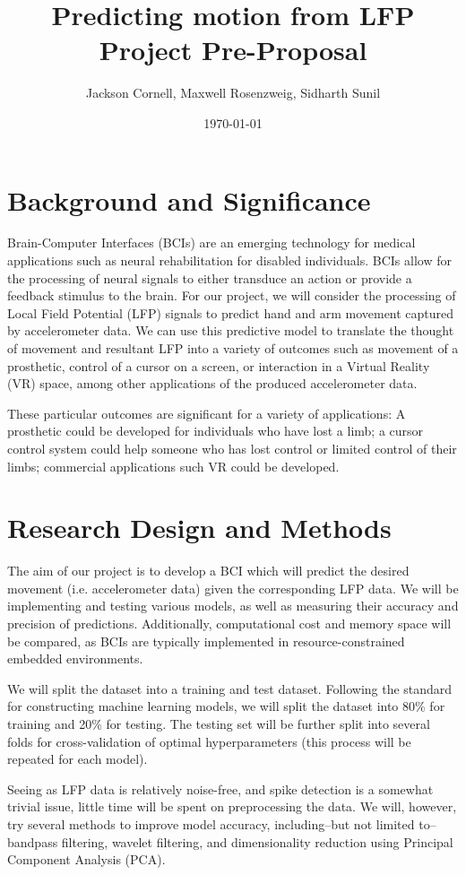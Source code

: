 \documentclass[12pt]{article}
\title{ Predicting motion from LFP Project Pre-Proposal }
\author{ Jackson Cornell, Maxwell Rosenzweig, Sidharth Sunil }
\date{\today}
\begin{document}
\maketitle

\section{Background and Significance}

Brain-Computer Interfaces (BCIs) are an emerging technology for medical applications such as neural rehabilitation for disabled individuals. BCIs allow for the processing of neural signals to either transduce an action or provide a feedback stimulus to the brain. For our project, we will consider the processing of Local Field Potential (LFP) signals to predict hand and arm movement captured by accelerometer data. We can use this predictive model to translate the thought of movement and resultant LFP into a variety of outcomes such as movement of a prosthetic, control of a cursor on a screen, or interaction in a Virtual Reality (VR) space, among other applications of the produced accelerometer data. 

These particular outcomes are significant for a variety of applications: A prosthetic could be developed for individuals who have lost a limb; a cursor control system could help someone who has lost control or limited control of their limbs; commercial applications such VR could be developed.

\section{Research Design and Methods}
The aim of our project is to develop a BCI which will predict the desired movement (i.e. accelerometer data) given the corresponding LFP data. We will be implementing and testing various models, as well as measuring their accuracy and precision of predictions. Additionally, computational cost and memory space will be compared, as BCIs are typically implemented in resource-constrained embedded environments.

We will split the dataset into a training and test dataset. Following the standard for constructing machine learning models, we will split the dataset into 80\% for training and 20\% for testing. The testing set will be further split into several folds for cross-validation of optimal hyperparameters (this process will be repeated for each model).

Seeing as LFP data is relatively noise-free, and spike detection is a somewhat trivial issue, little time will be spent on preprocessing the data. We will, however, try several methods to improve model accuracy, including--but not limited to--bandpass filtering, wavelet filtering, and dimensionality reduction using Principal Component Analysis (PCA).
\end{document}
